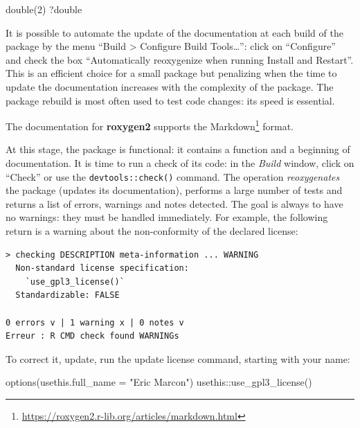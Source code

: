 \documentclass[
  12pt,
  american,
  a4paper,
  extrafontsizes,onecolumn,openright
  ]{memoir}
\newenvironment{Shaded}{\begin{snugshade}}{\end{snugshade}}
\newcommand{\AttributeTok}[1]{\textcolor[rgb]{0.77,0.63,0.00}{#1}}
\newcommand{\DecValTok}[1]{\textcolor[rgb]{0.00,0.00,0.81}{#1}}
\newcommand{\FunctionTok}[1]{\textcolor[rgb]{0.00,0.00,0.00}{#1}}
\newcommand{\NormalTok}[1]{#1}
\newcommand{\SpecialCharTok}[1]{\textcolor[rgb]{0.00,0.00,0.00}{#1}}
\newcommand{\StringTok}[1]{\textcolor[rgb]{0.31,0.60,0.02}{#1}}
\newlength{\rf}
\begin{document}
\scriptsize

\begin{Shaded}
\begin{Highlighting}[]
\FunctionTok{double}\NormalTok{(}\DecValTok{2}\NormalTok{)}
\NormalTok{?double}
\end{Highlighting}
\end{Shaded}

\normalsize

It is possible to automate the update of the documentation at each build of the package by the menu \enquote{Build \textgreater{} Configure Build Tools\ldots{}}: click on \enquote{Configure} and check the box \enquote{Automatically reoxygenize when running Install and Restart}.
This is an efficient choice for a small package but penalizing when the time to update the documentation increases with the complexity of the package. The package rebuild is most often used to test code changes: its speed is essential.

The documentation for \textbf{roxygen2} supports the Markdown\footnote{\url{https://roxygen2.r-lib.org/articles/markdown.html}} format.

At this stage, the package is functional: it contains a function and a beginning of documentation.
It is time to run a check of its code: in the \emph{Build} window, click on \enquote{Check} or use the \texttt{devtools::check()} command.
The operation \emph{reoxygenates} the package (updates its documentation), performs a large number of tests and returns a list of errors, warnings and notes detected.
The goal is always to have no warnings: they must be handled immediately.
For example, the following return is a warning about the non-conformity of the declared license:

\begin{verbatim}
> checking DESCRIPTION meta-information ... WARNING
  Non-standard license specification:
    `use_gpl3_license()`
  Standardizable: FALSE

0 errors v | 1 warning x | 0 notes v
Erreur : R CMD check found WARNINGs
\end{verbatim}

To correct it, update, run the update license command, starting with your name:

\scriptsize

\begin{Shaded}
\begin{Highlighting}[]
\FunctionTok{options}\NormalTok{(}\AttributeTok{usethis.full\_name =} \StringTok{"Eric Marcon"}\NormalTok{)}
\NormalTok{usethis}\SpecialCharTok{::}\FunctionTok{use\_gpl3\_license}\NormalTok{()}
\end{Highlighting}
\end{Shaded}
\end{document}
